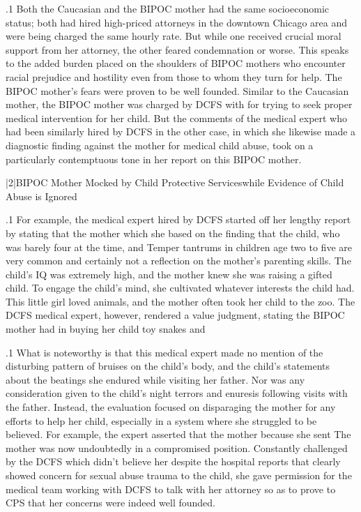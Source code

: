\documentclass[11pt, twoside]{article}
\begin{document}
{\p.1{%
Both the Caucasian and the BIPOC mother had the same socioeconomic status; both had hired high-priced attorneys in the downtown
Chicago area and were being charged the same hourly rate. But while
one received crucial moral support from her attorney, the other feared
condemnation or worse. This speaks to the added burden placed on the
shoulders of BIPOC mothers who encounter racial prejudice and hostility even from those to whom they turn for help. The BIPOC mother's
fears were proven to be well founded. Similar to the Caucasian mother,
the BIPOC mother was charged by DCFS with  for
trying to seek proper medical intervention for her child. But the comments of the medical expert who had been similarly hired by DCFS in the other case,
in which she likewise made a diagnostic finding against the mother
for medical child abuse, took on a particularly contemptuous tone in her
report on this BIPOC mother.
}%


\s|2|{BIPOC Mother Mocked by Child Protective Services\mdash{}while Evidence of Child Abuse is Ignored}

\p.1{%
\noindent{}For example, the medical expert hired by DCFS started off her lengthy
report by stating that the mother  which she based on the finding that the child, who was
barely four at the time,  and  Temper tantrums in children age two to five are
very common and certainly not a reflection on the mother's parenting skills. The child's IQ was extremely high, and the mother knew
she was raising a gifted child. To engage the child's mind, she cultivated whatever interests the child had. This little girl loved animals,
and the mother often took her child to the zoo. The DCFS medical expert, however, rendered a value judgment, stating the BIPOC
mother had  in buying her child toy
snakes and 
}%

\p.1{%
What is noteworthy is that this medical expert made no mention of
the disturbing pattern of bruises on the child's body, and the child's
statements about the beatings she endured while visiting her father.
Nor was any consideration given to the child's night terrors and enuresis following visits with the father. Instead, the evaluation focused on
disparaging the mother for any efforts to help her child, especially in a
system where she struggled to be believed. For example, the expert asserted that the mother  because she
sent  The mother was now undoubtedly in a compromised
position. Constantly challenged by the DCFS which didn't believe her
despite the hospital reports that clearly showed concern for sexual abuse
trauma to the child, she gave permission for the medical team working
with DCFS to talk with her attorney so as to prove to CPS that her
concerns were indeed well founded.
}%

}
\end{document}

